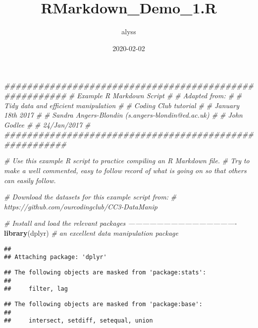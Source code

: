 \documentclass[
]{article}
\title{RMarkdown\_Demo\_1.R}
\author{alyss}
\date{2020-02-02}
\newenvironment{Shaded}{\begin{snugshade}}{\end{snugshade}}
\newcommand{\CommentTok}[1]{\textcolor[rgb]{0.56,0.35,0.01}{\textit{#1}}}
\newcommand{\KeywordTok}[1]{\textcolor[rgb]{0.13,0.29,0.53}{\textbf{#1}}}
\newcommand{\NormalTok}[1]{#1}
\begin{document}
\maketitle

\begin{Shaded}
\begin{Highlighting}[]
\CommentTok{#######################################################}
\CommentTok{# Example R Markdown Script                           #}
\CommentTok{# Adapted from:                                       #}
  \CommentTok{# Tidy data and efficient manipulation              #}
  \CommentTok{# Coding Club tutorial                              #  }
  \CommentTok{# January 18th 2017                                 #}
  \CommentTok{# Sandra Angers-Blondin (s.angers-blondin@ed.ac.uk) #}
\CommentTok{# John Godlee                                         #}
\CommentTok{# 24/Jan/2017                                         #}
\CommentTok{#######################################################}

\CommentTok{# Use this example R script to practice compiling an R Markdown file. }
\CommentTok{# Try to make a well commented, easy to follow record of what is going on so that others can easily follow.}

\CommentTok{# Download the datasets for this example script from:}
 \CommentTok{# https://github.com/ourcodingclub/CC3-DataManip}

\CommentTok{# Install and load the relevant packages ----------------------------------------------}
\KeywordTok{library}\NormalTok{(dplyr) }\CommentTok{# an excellent data manipulation package}
\end{Highlighting}
\end{Shaded}

\begin{verbatim}
## 
## Attaching package: 'dplyr'
\end{verbatim}

\begin{verbatim}
## The following objects are masked from 'package:stats':
## 
##     filter, lag
\end{verbatim}

\begin{verbatim}
## The following objects are masked from 'package:base':
## 
##     intersect, setdiff, setequal, union
\end{verbatim}
\end{document}
